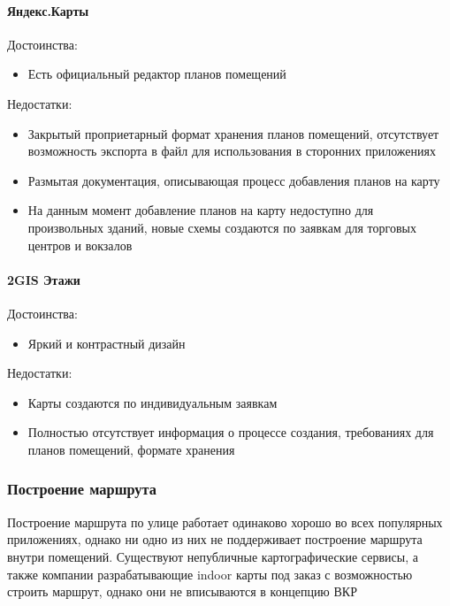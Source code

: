 
      \paragraph{Яндекс.Карты}

        \noindent Достоинства:
        \begin{itemize}
          \item Есть официальный редактор планов помещений
        \end{itemize}

        \noindent Недостатки:
        \begin{itemize}
          \item Закрытый проприетарный формат хранения планов помещений, отсутствует возможность экспорта в файл для использования в сторонних приложениях
          \item Размытая документация, описывающая процесс добавления планов на карту
          \item На данным момент добавление планов на карту недоступно для произвольных зданий, новые схемы создаются по заявкам для торговых центров и вокзалов
        \end{itemize}


      \paragraph{2GIS Этажи}

        \noindent Достоинства:
        \begin{itemize}
          \item Яркий и контрастный дизайн
        \end{itemize}

        \noindent Недостатки:
        \begin{itemize}
          \item Карты создаются по индивидуальным заявкам
          \item Полностью отсутствует информация о процессе создания, требованиях для планов помещений, формате хранения
        \end{itemize}

    \subsubsection{Построение маршрута}
      Построение маршрута по улице работает одинаково хорошо во всех популярных приложениях, однако ни одно из них не поддерживает построение маршрута внутри помещений. Существуют непубличные картографические сервисы, а также компании разрабатывающие indoor карты под заказ с возможностью строить маршрут, однако они не вписываются в концепцию ВКР

